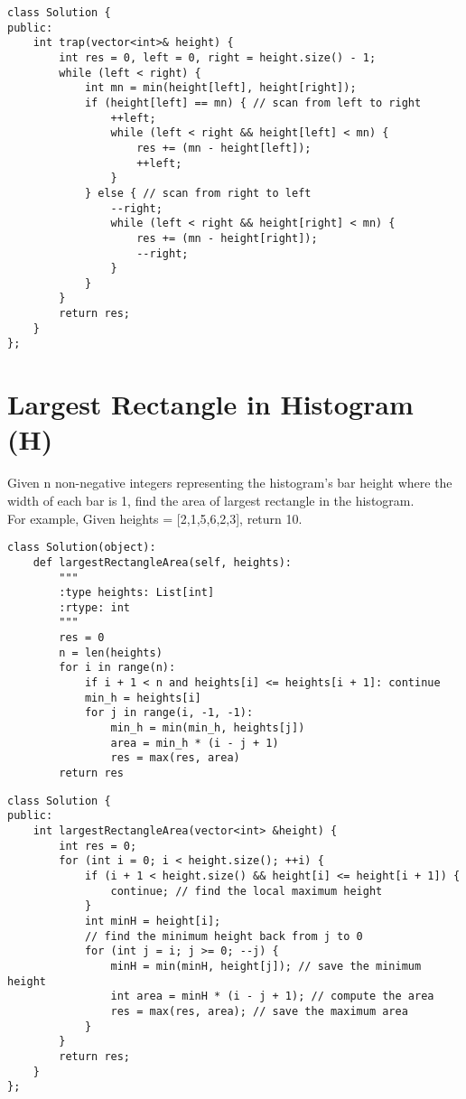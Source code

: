 \begin{lstlisting}
class Solution {
public:
    int trap(vector<int>& height) {
        int res = 0, left = 0, right = height.size() - 1;
        while (left < right) {
            int mn = min(height[left], height[right]);
            if (height[left] == mn) { // scan from left to right
                ++left;
                while (left < right && height[left] < mn) {
                    res += (mn - height[left]);
                    ++left;
                }
            } else { // scan from right to left
                --right;
                while (left < right && height[right] < mn) {
                    res += (mn - height[right]);
                    --right;
                }
            }
        }
        return res;
    }
};
\end{lstlisting}


\section{Largest Rectangle in Histogram (H)}
Given n non-negative integers representing the histogram's bar height where the width of each bar is 1, find the area of largest rectangle in the histogram. \\

For example,
Given heights = [2,1,5,6,2,3],
return 10. \\

\begin{lstlisting}
class Solution(object):
    def largestRectangleArea(self, heights):
        """
        :type heights: List[int]
        :rtype: int
        """
        res = 0
        n = len(heights)
        for i in range(n):
            if i + 1 < n and heights[i] <= heights[i + 1]: continue
            min_h = heights[i]
            for j in range(i, -1, -1):
                min_h = min(min_h, heights[j])
                area = min_h * (i - j + 1)
                res = max(res, area)
        return res
\end{lstlisting}

\begin{lstlisting}
class Solution {
public:
    int largestRectangleArea(vector<int> &height) {
        int res = 0;
        for (int i = 0; i < height.size(); ++i) {
            if (i + 1 < height.size() && height[i] <= height[i + 1]) {
                continue; // find the local maximum height
            }
            int minH = height[i];
            // find the minimum height back from j to 0
            for (int j = i; j >= 0; --j) { 
                minH = min(minH, height[j]); // save the minimum height
                int area = minH * (i - j + 1); // compute the area
                res = max(res, area); // save the maximum area
            }
        }
        return res;
    }
};
\end{lstlisting}



